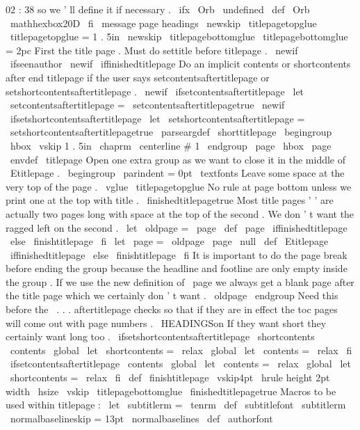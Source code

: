 {02
:
38
%
so
we
'
ll
define
it
if
necessary
.
%
\
ifx
\
Orb
\
undefined
\
def
\
Orb
{
\
mathhexbox20D
}
\
fi
\
message
{
page
headings
}
\
newskip
\
titlepagetopglue
\
titlepagetopglue
=
1
.
5in
\
newskip
\
titlepagebottomglue
\
titlepagebottomglue
=
2pc
%
First
the
title
page
.
Must
do
settitle
before
titlepage
.
\
newif
\
ifseenauthor
\
newif
\
iffinishedtitlepage
%
Do
an
implicit
contents
or
shortcontents
after
end
titlepage
if
the
%
user
says
setcontentsaftertitlepage
or
setshortcontentsaftertitlepage
.
%
\
newif
\
ifsetcontentsaftertitlepage
\
let
\
setcontentsaftertitlepage
=
\
setcontentsaftertitlepagetrue
\
newif
\
ifsetshortcontentsaftertitlepage
\
let
\
setshortcontentsaftertitlepage
=
\
setshortcontentsaftertitlepagetrue
\
parseargdef
\
shorttitlepage
{
\
begingroup
\
hbox
{
}
\
vskip
1
.
5in
\
chaprm
\
centerline
{
#
1
}
%
\
endgroup
\
page
\
hbox
{
}
\
page
}
\
envdef
\
titlepage
{
%
%
Open
one
extra
group
as
we
want
to
close
it
in
the
middle
of
\
Etitlepage
.
\
begingroup
\
parindent
=
0pt
\
textfonts
%
Leave
some
space
at
the
very
top
of
the
page
.
\
vglue
\
titlepagetopglue
%
No
rule
at
page
bottom
unless
we
print
one
at
the
top
with
title
.
\
finishedtitlepagetrue
%
%
Most
title
pages
'
'
are
actually
two
pages
long
with
space
%
at
the
top
of
the
second
.
We
don
'
t
want
the
ragged
left
on
the
second
.
\
let
\
oldpage
=
\
page
\
def
\
page
{
%
\
iffinishedtitlepage
\
else
\
finishtitlepage
\
fi
\
let
\
page
=
\
oldpage
\
page
\
null
}
%
}
\
def
\
Etitlepage
{
%
\
iffinishedtitlepage
\
else
\
finishtitlepage
\
fi
%
It
is
important
to
do
the
page
break
before
ending
the
group
%
because
the
headline
and
footline
are
only
empty
inside
the
group
.
%
If
we
use
the
new
definition
of
\
page
we
always
get
a
blank
page
%
after
the
title
page
which
we
certainly
don
'
t
want
.
\
oldpage
\
endgroup
%
%
Need
this
before
the
\
.
.
.
aftertitlepage
checks
so
that
if
they
are
%
in
effect
the
toc
pages
will
come
out
with
page
numbers
.
\
HEADINGSon
%
%
If
they
want
short
they
certainly
want
long
too
.
\
ifsetshortcontentsaftertitlepage
\
shortcontents
\
contents
\
global
\
let
\
shortcontents
=
\
relax
\
global
\
let
\
contents
=
\
relax
\
fi
%
\
ifsetcontentsaftertitlepage
\
contents
\
global
\
let
\
contents
=
\
relax
\
global
\
let
\
shortcontents
=
\
relax
\
fi
}
\
def
\
finishtitlepage
{
%
\
vskip4pt
\
hrule
height
2pt
width
\
hsize
\
vskip
\
titlepagebottomglue
\
finishedtitlepagetrue
}
%
%
%
Macros
to
be
used
within
titlepage
:
\
let
\
subtitlerm
=
\
tenrm
\
def
\
subtitlefont
{
\
subtitlerm
\
normalbaselineskip
=
13pt
\
normalbaselines
}
\
def
\
authorfont
}
